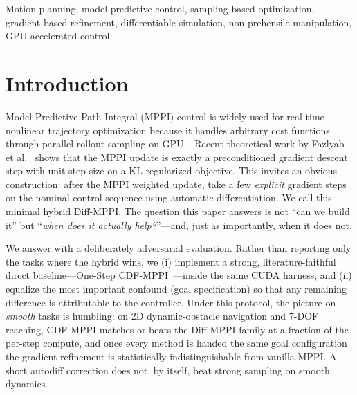 \documentclass[journal]{IEEEtran}
\begin{document}
\begin{abstract}
different hard-contact plant (exact non-penetration, Coulomb friction, momentum)
shows the win survives a genuine change of contact model on the loose task, with an
honest boundary on tight-tolerance high-friction tasks that we trace to gradient
\emph{direction} (the cosine between the smooth gradient and the true plant's cost
sensitivity collapses exactly where success does); and a differentiability-vs-fidelity
comparison shows the gradient can beat even an exact-model sampler given $16\times$
the budget. The contribution is thus a clearly scoped, mechanism-supported positive
result with a rigorous negative control: gradient refinement buys what sampling
cannot precisely when information is carried by the contact gradient.
\end{abstract}

\begin{IEEEkeywords}
Motion planning, model predictive control, sampling-based optimization,
gradient-based refinement, differentiable simulation, non-prehensile
manipulation, GPU-accelerated control
\end{IEEEkeywords}

\section{Introduction}
\label{sec:introduction}

Model Predictive Path Integral (MPPI) control is widely used for real-time
nonlinear trajectory optimization because it handles arbitrary cost functions
through parallel rollout sampling on GPU~\cite{williams2017mppi}. Recent
theoretical work by Fazlyab et al.~\cite{fazlyab2026mppi_gd} shows that the
MPPI update is exactly a preconditioned gradient descent step with unit step
size on a KL-regularized objective. This invites an obvious construction: after
the MPPI weighted update, take a few \emph{explicit} gradient steps on the
nominal control sequence using automatic differentiation. We call this minimal
hybrid Diff-MPPI. The question this paper answers is not ``can we build it'' but
``\emph{when does it actually help?}''---and, just as importantly, when it does
not.

We answer with a deliberately adversarial evaluation. Rather than reporting only
the tasks where the hybrid wins, we (i) implement a strong, literature-faithful
direct baseline---One-Step CDF-MPPI~\cite{cdf_mppi}---inside the same CUDA
harness, and (ii) equalize the most important confound (goal specification) so
that any remaining difference is attributable to the controller. Under this
protocol, the picture on \emph{smooth} tasks is humbling: on 2D dynamic-obstacle
navigation and 7-DOF reaching, CDF-MPPI matches or beats the Diff-MPPI family at
a fraction of the per-step compute, and once every method is handed the same
goal configuration the gradient refinement is statistically indistinguishable
from vanilla MPPI. A short autodiff correction does not, by itself, beat strong
sampling on smooth dynamics.
\end{document}

